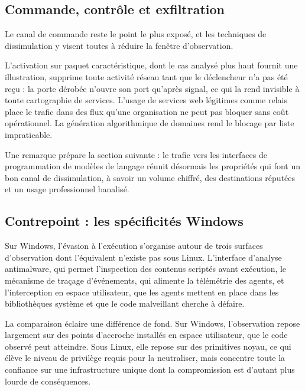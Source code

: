 \subsection{Commande, contrôle et exfiltration}

Le canal de commande reste le point le plus exposé, et les techniques de dissimulation y visent toutes à réduire la fenêtre d'observation.

L'activation sur paquet caractéristique, dont le cas analysé plus haut fournit une illustration, supprime toute activité réseau tant que le déclencheur n'a pas été reçu : la porte dérobée n'ouvre son port qu'après signal, ce qui la rend invisible à toute cartographie de services. L'usage de services web légitimes comme relais place le trafic dans des flux qu'une organisation ne peut pas bloquer sans coût opérationnel. La génération algorithmique de domaines rend le blocage par liste impraticable.

Une remarque prépare la section suivante : le trafic vers les interfaces de programmation de modèles de langage réunit désormais les propriétés qui font un bon canal de dissimulation, à savoir un volume chiffré, des destinations réputées et un usage professionnel banalisé.

\subsection{Contrepoint : les spécificités Windows}

Sur Windows, l'évasion à l'exécution s'organise autour de trois surfaces d'observation dont l'équivalent n'existe pas sous Linux. L'interface d'analyse antimalware, qui permet l'inspection des contenus scriptés avant exécution, le mécanisme de traçage d'événements, qui alimente la télémétrie des agents, et l'interception en espace utilisateur, que les agents mettent en place dans les bibliothèques système et que le code malveillant cherche à défaire.

La comparaison éclaire une différence de fond. Sur Windows, l'observation repose largement sur des points d'accroche installés en espace utilisateur, que le code observé peut atteindre. Sous Linux, elle repose sur des primitives noyau, ce qui élève le niveau de privilège requis pour la neutraliser, mais concentre toute la confiance sur une infrastructure unique dont la compromission est d'autant plus lourde de conséquences.


